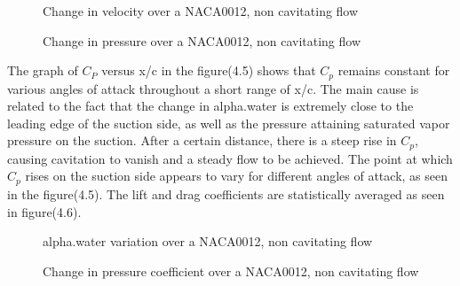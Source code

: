 \begin{figure}[H]
    \centering
    \qquad
   \qquad
      \caption{Change in velocity over a NACA0012, non cavitating flow}
    \label{fig:fig16}
\end{figure}
 \begin{figure}[H]
    \centering
    \qquad
   \qquad
      \caption{Change in pressure over a NACA0012, non cavitating flow}
    \label{fig:fig16}
\end{figure}
The graph of $C_P$ versus x/c in the figure(4.5) shows that $C_p$ remains constant for various angles of attack throughout a short range of x/c.
The main cause is related to the fact that the change in alpha.water is extremely close to the leading edge of 
the suction side, as well as the pressure attaining saturated vapor pressure on the suction.
After a certain distance, there is a steep rise in $C_p$, causing cavitation to vanish and a steady flow to be achieved.
The point at which $C_p$ rises on the suction side appears to vary for different angles of attack, as seen in the figure(4.5). 
The lift and drag coefficients are statistically averaged as seen in figure(4.6).
  \begin{figure}[H]
    \centering
    \qquad
   \qquad
      \caption{alpha.water variation over a NACA0012, non cavitating flow}
    \label{fig:fig16}
\end{figure}
 \begin{figure}[H]
    \centering
    \qquad
   \qquad
      \caption{Change in pressure coefficient over a NACA0012, non cavitating flow}
    \label{fig:fig16}
\end{figure} 
  
